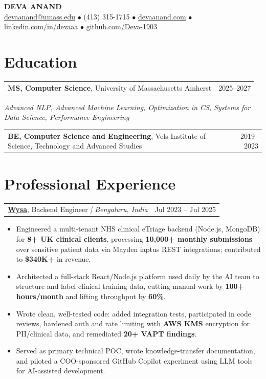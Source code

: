 \documentclass[letterpaper,11pt]{article}
\makeatletter
\newcommand{\eduItem}[3]{%
  \begin{tabular*}{\textwidth}{@{}l@{\extracolsep{\fill}}r@{}}
    \textbf{#1}, #2 & #3 \\
  \end{tabular*}\par
}
\newcommand{\expItem}[4]{%
  \vspace{3pt}
  \begin{tabular*}{\textwidth}{@{}l@{\extracolsep{\fill}}r@{}}
    \textbf{#1}, #2 \textit{| #3} & #4 \\
  \end{tabular*}\par\vspace{-2pt}
}
\makeatother
\begin{document}
\begin{center}
    {\fontsize{18}{20}\selectfont\bfseries DEVA ANAND}\\ \vspace{3pt}
    {\small
    \href{mailto:devaanand@umass.edu}{devaanand@umass.edu}
    \enspace$\bullet$\enspace
    (413) 315-1715
    \enspace$\bullet$\enspace
    \href{https://devaanand.com}{devaanand.com}
    \enspace$\bullet$\enspace
    \href{https://linkedin.com/in/devaaa/}{linkedin.com/in/devaaa}
    \enspace$\bullet$\enspace
    \href{https://github.com/Deva-1903}{github.com/Deva-1903}}
\end{center}
\vspace{-6pt}

\section{Education}
\eduItem{MS, Computer Science}{University of Massachusetts Amherst}{2025--2027}
{\small\textit{Advanced NLP, Advanced Machine Learning, Optimization in CS, Systems for Data Science, Performance Engineering}}\par
\vspace{3pt}
\eduItem{BE, Computer Science and Engineering}{Vels Institute of Science, Technology and Advanced Studies}{2019--2023}

\section{Professional Experience}

\expItem{\href{https://www.wysa.io}{Wysa}}{Backend Engineer}{Bengaluru, India}{Jul 2023 -- Jul 2025}
\begin{itemize}
  \item Engineered a multi-tenant NHS clinical eTriage backend (Node.js, MongoDB) for \textbf{8+ UK clinical clients}, processing \textbf{10{,}000+ monthly submissions} over sensitive patient data via Mayden iaptus REST integrations; contributed to \textbf{\$340K+} in revenue.
  \item Architected a full-stack React/Node.js platform used daily by the AI team to structure and label clinical training data, cutting manual work by \textbf{100+ hours/month} and lifting throughput by \textbf{60\%}.
  \item Wrote clean, well-tested code: added integration tests, participated in code reviews, hardened auth and rate limiting with \textbf{AWS KMS} encryption for PII/clinical data, and remediated \textbf{20+ VAPT findings}.
  \item Served as primary technical POC, wrote knowledge-transfer documentation, and piloted a COO-sponsored GitHub Copilot experiment using LLM tools for AI-assisted development.
\end{itemize}
\end{document}
